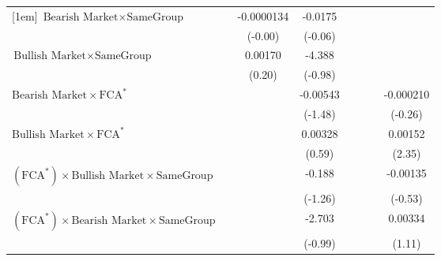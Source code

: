 {\begin{tabular}{l*{7}{c}}
[1em]
$ {\text{Bearish Market} } \times {\text{SameGroup} }  $ &                  &-0.0000134         &  -0.0175         &                  &                  &                  &                  \\
                &                  &  (-0.00)         &  (-0.06)         &                  &                  &                  &                  \\
[1em]
$ {\text{Bullish Market} } \times {\text{SameGroup} }  $ &                  &  0.00170         &   -4.388         &                  &                  &                  &                  \\
                &                  &   (0.20)         &  (-0.98)         &                  &                  &                  &                  \\
[1em]
$ {\text{Bearish Market} } \times \text{FCA}^*  $ &                  &                  & -0.00543         &                  &                  &                  &-0.000210         \\
                &                  &                  &  (-1.48)         &                  &                  &                  &  (-0.26)         \\
[1em]
$ {\text{Bullish Market} } \times \text{FCA}^*   $ &                  &                  &  0.00328         &                  &                  &                  &  0.00152\sym{*}  \\
                &                  &                  &   (0.59)         &                  &                  &                  &   (2.35)         \\
[1em]
$ (\text{FCA}^*) \times {\text{Bullish Market}} \times {\text{SameGroup} }  $ &                  &                  &   -0.188         &                  &                  &                  & -0.00135         \\
                &                  &                  &  (-1.26)         &                  &                  &                  &  (-0.53)         \\
[1em]
$ (\text{FCA}^*) \times {\text{Bearish Market}} \times {\text{SameGroup} }  $ &                  &                  &   -2.703         &                  &                  &                  &  0.00334         \\
                &                  &                  &  (-0.99)         &                  &                  &                  &   (1.11)         \\

\end{tabular}}

